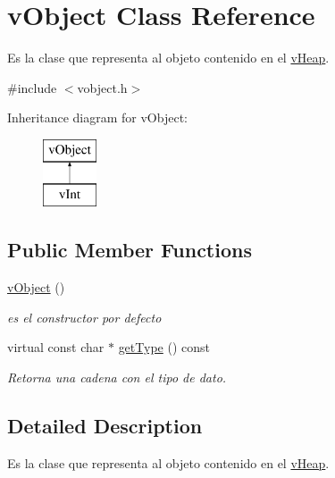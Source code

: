 \hypertarget{classv_object}{\section{v\-Object Class Reference}
\label{classv_object}
}


Es la clase que representa al objeto contenido en el \hyperlink{classv_heap}{v\-Heap}.  




{\ttfamily \#include $<$vobject.\-h$>$}

Inheritance diagram for v\-Object\-:\begin{figure}[H]
\begin{center}
\leavevmode
\includegraphics[height=2.000000cm]{classv_object}
\end{center}
\end{figure}
\subsection*{Public Member Functions}
\begin{DoxyCompactItemize}
\item 
\hypertarget{classv_object_af5d1cd42c54c5e33da3dfe5ce747acad}{\hyperlink{classv_object_af5d1cd42c54c5e33da3dfe5ce747acad}{v\-Object} ()}\label{classv_object_af5d1cd42c54c5e33da3dfe5ce747acad}

\begin{DoxyCompactList}\small\item\em es el constructor por defecto \end{DoxyCompactList}\item 
virtual const char $\ast$ \hyperlink{classv_object_a839d2dd4f326f6ae698d832744bf59ce}{get\-Type} () const 
\begin{DoxyCompactList}\small\item\em Retorna una cadena con el tipo de dato. \end{DoxyCompactList}\end{DoxyCompactItemize}


\subsection{Detailed Description}
Es la clase que representa al objeto contenido en el \hyperlink{classv_heap}{v\-Heap}. 

